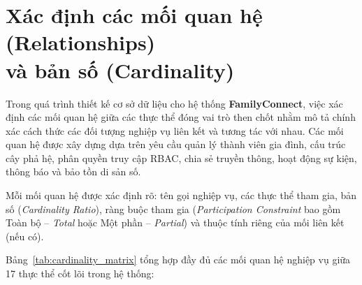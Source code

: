 
\section[Xác định các mối quan hệ và bản số (Cardinality)]{Xác định các mối quan hệ (Relationships)\\và bản số (Cardinality)}
\label{sec:1_2_quan_he_cardinality}

Trong quá trình thiết kế cơ sở dữ liệu cho hệ thống \textbf{FamilyConnect}, việc xác định các mối quan hệ giữa các thực thể đóng vai trò then chốt nhằm mô tả chính xác cách thức các đối tượng nghiệp vụ liên kết và tương tác với nhau. Các mối quan hệ được xây dựng dựa trên yêu cầu quản lý thành viên gia đình, cấu trúc cây phả hệ, phân quyền truy cập RBAC, chia sẻ truyền thông, hoạt động sự kiện, thông báo và bảo tồn di sản số.

Mỗi mối quan hệ được xác định rõ: tên gọi nghiệp vụ, các thực thể tham gia, bản số (\textit{Cardinality Ratio}), ràng buộc tham gia (\textit{Participation Constraint} bao gồm Toàn bộ -- \textit{Total} hoặc Một phần -- \textit{Partial}) và thuộc tính riêng của mối liên kết (nếu có).


Bảng~\ref{tab:cardinality_matrix} tổng hợp đầy đủ các mối quan hệ nghiệp vụ giữa 17 thực thể cốt lõi trong hệ thống:

\setlength{\arrayrulewidth}{0.6pt}
\renewcommand{\arraystretch}{1.5}

